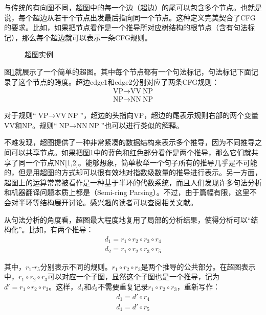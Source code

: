 \parinterval 与传统的有向图不同，超图中的每一个边（超边）的尾可以包含多个节点。也就是说，每个超边从若干个节点出发最后指向同一个节点。这种定义完美契合了CFG的要求。比如，如果把节点看作是一个推导所对应树结构的根节点（含有句法标记），那么每个超边就可以表示一条CFG规则。

\begin{figure}[htp]
\centering

\caption{超图实例}
\label{fig:4-64}
\end{figure}

\parinterval 图\ref{fig:4-64}就展示了一个简单的超图。其中每个节点都有一个句法标记，句法标记下面记录了这个节点的跨度。超边edge1和edge2分别对应了两条CFG规则：
\begin{eqnarray}
\textrm{VP} \rightarrow \textrm{VV}\ \textrm{NP} \nonumber \\
\textrm{NP} \rightarrow \textrm{NN}\ \textrm{NP} \nonumber
\end{eqnarray}

\parinterval 对于规则``$\textrm{VP} \rightarrow \textrm{VV}\ \textrm{NP}$''，超边的头指向VP，超边的尾表示规则右部的两个变量VV和NP。规则``$\textrm{NP} \rightarrow \textrm{NN}\ \textrm{NP}$''也可以进行类似的解释。

\parinterval 不难发现，超图提供了一种非常紧凑的数据结构来表示多个推导，因为不同推导之间可以共享节点。如果把图\ref{fig:4-64}中的蓝色和红色部分看作是两个推导，那么它们就共享了同一个节点NN[1,2]。能够想象，简单枚举一个句子所有的推导几乎是不可能的，但是用超图的方式却可以很有效地对指数级数量的推导进行表示。另一方面，超图上的运算常常被看作是一种基于半环的代数系统，而且人们发现许多句法分析和机器翻译问题本质上都是{\small{}}（Semi-ring Parsing）。不过，由于篇幅有限，这里不会对半环等结构展开讨论。感兴趣的读者可以查阅相关文献\cite{goodman1999semiring,eisner2002parameter}。

\parinterval 从句法分析的角度看，超图最大程度地复用了局部的分析结果，使得分析可以``结构化''。比如，有两个推导：
\begin{eqnarray}
d_1 = {r_1} \circ {r_2} \circ {r_3} \circ {r_4} \label{eqa4.30}\\
d_2 = {r_1} \circ {r_2} \circ {r_3} \circ {r_5}
\label{eq:4-31}
\end{eqnarray}

\noindent 其中，$r_1$-$r_5$分别表示不同的规则。${r_1} \circ {r_2} \circ {r_3}$是两个推导的公共部分。在超图表示中，${r_1} \circ {r_2} \circ {r_3}$可以对应一个子图，显然这个子图也是一个推导，记为${d'}= {r_1} \circ {r_2} \circ {r_3}$。这样，$d_1$和$d_2$不需要重复记录${r_1} \circ {r_2} \circ {r_3}$，重新写作：
\begin{eqnarray}
d_1 = {d'} \circ {r_4} \label{eqa4.32}\\
d_1 = {d'} \circ {r_5}
\label{eq:4-33}
\end{eqnarray}

